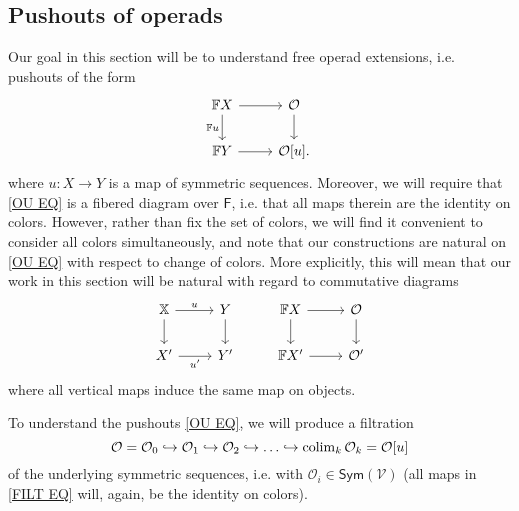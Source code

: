 \documentclass[a4paper,10pt
,draft
]{article}%
\renewcommand{\1}{\eta}%
\begin{document}
\subsection{Pushouts of operads}



Our goal in this section will be to understand free operad extensions, i.e. pushouts of the form 
\begin{equation}\label{OU EQ}
            \begin{tikzcd}
                  \mathbb F X \arrow[d, "\mathbb{F}u"'] \arrow[r]
                  &
                  \O \arrow[d]
                  \\
                  \mathbb F Y \arrow[r]
                  &
                  \O[u].
            \end{tikzcd}
\end{equation}
where $u \colon X \to Y$ is a map of symmetric sequences.
Moreover, we will require that \eqref{OU EQ} is a fibered diagram over $\mathsf{F}$, i.e. that all maps therein are the identity on colors.
However, rather than fix the set of colors, 
we will find it convenient to consider all colors simultaneously, 
and note that our constructions are natural 
on \eqref{OU EQ} with respect to change of colors.
More explicitly, this will mean that our work in this section will be natural with regard to commutative diagrams
\begin{equation}\label{COLORCHNAT EQ}
	\begin{tikzcd}
		\mathbb X \arrow[r, "u"',swap] \arrow[d]
	&
		Y \arrow[d]
&
		\mathbb F X \arrow[d] \arrow[r]
	&
		\O \arrow[d]
\\
		X' \arrow[r, "u'"']
	&
		Y'
&
		\mathbb F X' \arrow[r]
	&
		\O'
	\end{tikzcd}
\end{equation}
where all vertical maps induce the same map on objects.


To understand the pushouts \eqref{OU EQ},
we will produce a filtration
\begin{equation}\label{FILT EQ}
      \O = \O_0 \into \O_1 \into \O_2 \into \dots \into \colim_k \O_k = \O[u]
\end{equation}
of the underlying symmetric sequences, i.e. with 
$\mathcal{O}_i \in \mathsf{Sym}(\mathcal{V})$
(all maps in \eqref{FILT EQ} will, again, be the identity on colors).
\end{document}
